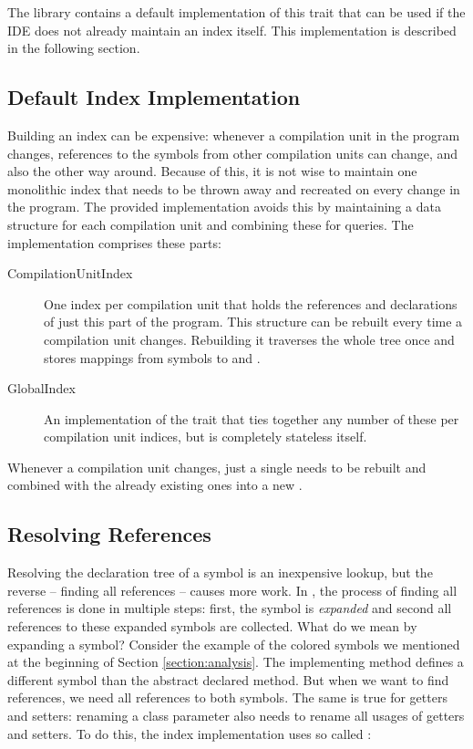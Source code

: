 The library contains a default implementation of this trait that can be used if the IDE does not already maintain an index itself. This implementation is described in the following section.

\subsection{Default Index Implementation}

Building an index can be expensive: whenever a compilation unit in the program changes, references to the symbols from other compilation units can change, and also the other way around. Because of this, it is not wise to maintain one monolithic index that needs to be thrown away and recreated on every change in the program. The provided implementation avoids this by maintaining a data structure for each compilation unit and combining these for queries. The implementation comprises these parts:

\begin{description}
 \item[CompilationUnitIndex] One index per compilation unit that holds the references and declarations of just this part of the program. This structure can be rebuilt every time a compilation unit changes. Rebuilding it traverses the whole tree once and stores mappings from symbols to  and .
 \item[GlobalIndex] An implementation of the  trait that ties together any number of these per compilation unit indices, but is completely stateless itself.
\end{description}

Whenever a compilation unit changes, just a single  needs to be rebuilt and combined with the already existing ones into a new .

\subsection{Resolving References}

Resolving the declaration tree of a symbol is an inexpensive lookup, but the reverse -- finding all references -- causes more work. In , the process of finding all references is done in multiple steps: first, the symbol is \textit{expanded} and second all references to these expanded symbols are collected. What do we mean by expanding a symbol? Consider the example of the colored symbols we mentioned at the beginning of Section \ref{section:analysis}. The implementing method defines a different symbol than the abstract declared method. But when we want to find references, we need all references to both symbols. The same is true for getters and setters: renaming a class parameter also needs to rename all usages of getters and setters. To do this, the index implementation uses so called :

